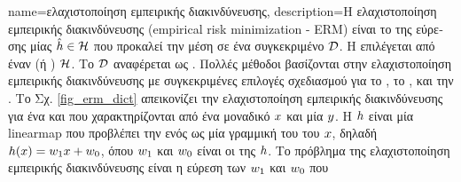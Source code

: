 {name={\foreignlanguage{greek}{ελαχιστοποίηση εμπειρικής διακινδύνευσης}}, 
	description={\foreignlanguage{greek}{Η ελαχιστοποίηση εμπειρικής 
		διακινδύνευσης} 
		(empirical risk minimization - ERM) \foreignlanguage{greek}{είναι το}  \foreignlanguage{greek}{της  
		εύρεσης μίας}  $\hat{h} \in \mathcal{H}$ \foreignlanguage{greek}{που προκαλεί την}
		 \foreignlanguage{greek}{μέση}  \foreignlanguage{greek}{σε ένα συγκεκριμένο} 
		 $\mathcal{D}$. \foreignlanguage{greek}{Η}  \foreignlanguage{greek}{επιλέγεται 
		από έναν}  (\foreignlanguage{greek}{ή} ) $\mathcal{H}$. \foreignlanguage{greek}{Το} 
		 $\mathcal{D}$ \foreignlanguage{greek}{αναφέρεται ως} . \foreignlanguage{greek}{Πολλές 
		μέθοδοι}  \foreignlanguage{greek}{βασίζονται στην ελαχιστοποίηση εμπειρικής διακινδύνευσης με συγκεκριμένες 
		επιλογές σχεδιασμού για το} , \foreignlanguage{greek}{το} , \foreignlanguage{greek}{και 
		την}  \cite[\foreignlanguage{greek}{Κεφ.} 3]{MLBasics}.
		\foreignlanguage{greek}{Το Σχ.} \ref{fig_erm_dict} \foreignlanguage{greek}{απεικονίζει την ελαχιστοποίηση εμπειρικής διακινδύνευσης 
		για ένα}  \foreignlanguage{greek}{και}  \foreignlanguage{greek}{που χαρακτηρίζονται 
		από ένα μοναδικό}  $x$ \foreignlanguage{greek}{και μία}  $y$. 
		\foreignlanguage{greek}{Η}  $h$ \foreignlanguage{greek}{είναι μία} \gls{linearmap} 
		\foreignlanguage{greek}{που προβλέπει την}  \foreignlanguage{greek}{ενός}  
		\foreignlanguage{greek}{ως μία γραμμική}  \foreignlanguage{greek}{του}  
		\foreignlanguage{greek}{του} $x$, \foreignlanguage{greek}{δηλαδή $h(x) = w_{1} x + w_{0}$, 
		όπου $w_{1}$ και $w_{0}$ είναι οι}  \foreignlanguage{greek}{της} 
		 $h$. \foreignlanguage{greek}{Το πρόβλημα της ελαχιστοποίηση εμπειρικής διακινδύνευσης 
		είναι η εύρεση των}  $w_{1}$ \foreignlanguage{greek}{και} $w_{0}$ \foreignlanguage{greek}{που 
}}}
